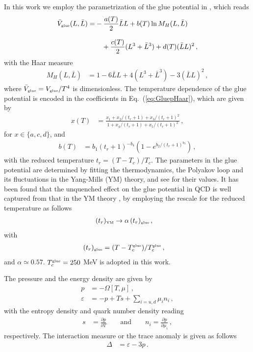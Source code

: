 \documentclass[%
reprint,
superscriptaddress,
showpacs,preprintnumbers,
 amsmath,amssymb,
 aps,
prd,
]{revtex4-1}
\def\Eq#1{Eq.~(\ref{#1})}
\begin{document}
In this work we employ the parametrization of the glue potential in \cite{Lo:2013hla}, which reads 
\begin{align}
  \bar V_{\text{\tiny{glue}}}(L,\bar L)=& -\frac{a(T)}{2} \bar L L + b(T)\ln M_H(L,\bar{L})\nonumber \\[2ex]
  &\quad + \frac{c(T)}{2} (L^3+\bar L^3) + d(T) (\bar{L} L)^2\,,\label{eq:GluepHaar}
\end{align}
with the Haar measure 
\begin{align}
M_H (L, \bar{L})&= 1 -6 \bar{L}L + 4 (L^3+\bar{L}^3) - 3  (\bar{L}L)^2\,,
\end{align}
where $\bar V_{\text{\tiny{glue}}}=V_{\text{\tiny{glue}}}/T^4$ is dimensionless. The temperature dependence of the glue potential is encoded in the coefficients in \Eq{eq:GluepHaar}, which are given by
\begin{align}
  x(T) &= \frac{x_1 + x_2/(t_r+1) + x_3/(t_r+1)^2}{1 + x_4/(t_r+1) + x_5/(t_r+1)^2}\,,\label{eq:xT}
\end{align}
for $x\in \{a, c, d\}$, and 
\begin{align}
  b(T) &=b_1 (t_r+1)^{-b_4}\left (1 -e^{b_2/(t_r+1)^{b_3}} \right)\,,\label{eq:bT}
\end{align}
with the reduced temperature $t_r=(T-T_c)/T_c$. The parameters in the glue potential are determined by fitting the thermodynamics, the Polyakov loop and its fluctuations in the Yang-Mills (YM) theory, and see  \cite{Lo:2013hla} for their values. It has been found that the unquenched effect on the glue potential in QCD is well captured from that in the YM theory \cite{Haas:2013qwp}, by employing the rescale for the reduced temperature as follows
\begin{align}
  (t_r)_{\text{\tiny{YM}}}&\rightarrow \alpha\,(t_r)_{\text{\tiny{glue}}}\,,\label{}
\end{align}
with
\begin{align}
  (t_r)_{\text{\tiny{glue}}}&=(T-T_c^\text{\tiny{glue}})/T_c^\text{\tiny{glue}}\,,\label{}
\end{align}
and $\alpha \simeq 0.57$. $T_c^\text{\tiny{glue}}=250$ MeV is adopted in this work.

The pressure and the energy density are given by
\begin{align}
  p&=-\Omega[T,\mu]\,,\label{eq:pres}\\[2ex]
 \varepsilon&=-p+Ts +\sum_{i=u,d}\mu_i n_i\,,\label{}
\end{align}
with the entropy density and quark number density reading 
\begin{align}
  s&=\frac{\partial p}{\partial T}\qquad \text{and}\qquad n_i=\frac{\partial p}{\partial \mu_i}\,,\label{}
\end{align}
respectively. The interaction measure or the trace anomaly is given as follows
\begin{align}
  \Delta&=\varepsilon-3p\,.\label{}
\end{align}
\end{document}
